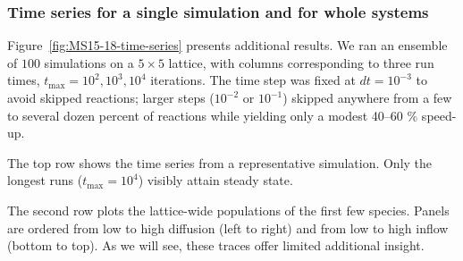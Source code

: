 \documentclass[11pt]{article}
\begin{document}
\clearpage

\subsubsection{Time series for a single simulation and for whole systems}

Figure~\ref{fig:MS15-18-time-series} presents additional results. We ran an ensemble of $100$ simulations on a $5 \times 5$ lattice, with columns corresponding to three run times, $t_\text{max}={10^{2},10^{3},10^{4}}$ iterations. The time step was fixed at $dt = 10^{-3}$ to avoid skipped reactions; larger steps ($10^{-2}$ or $10^{-1}$) skipped anywhere from a few to several dozen percent of reactions while yielding only a modest 40–60 \% speed-up.

The top row shows the time series from a representative simulation. Only the longest runs ($t_\text{max}=10^{4}$) visibly attain steady state.

The second row plots the lattice-wide populations of the first few species. Panels are ordered from low to high diffusion (left to right) and from low to high inflow (bottom to top). As we will see, these traces offer limited additional insight.
\end{document}
